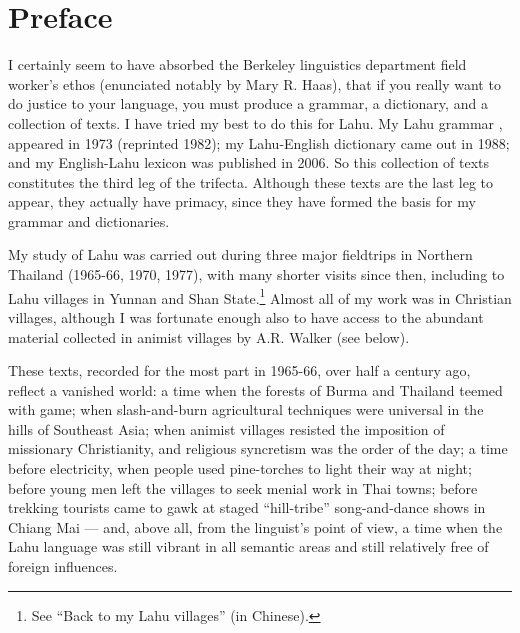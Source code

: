 \vspace{0.25em}

\renewcommand{\thefootnote}{\arabic{footnote}}
\setcounter{footnote}{0}


\chapter*{Preface}
I certainly seem to have absorbed the Berkeley linguistics department
field worker's ethos (enunciated notably by Mary R. Haas), that if you
really want to do justice to your language, you must produce a grammar,
a dictionary, and a collection of texts. I have tried my best to do this
for Lahu. My Lahu grammar \citep[abbreviated ``GL'']{matisoff1973grammar}, appeared in 1973 (reprinted 1982); my
Lahu-English dictionary \citep[abbreviated ``DL'']{88} came out in 1988; and my English-Lahu
lexicon \citep[abbreviated ``ELL'']{matisoff2006english} was published in 2006. So this collection of texts
constitutes the third leg of the trifecta. Although these texts are the
last leg to appear, they actually have primacy, since they have formed
the basis for my grammar and dictionaries.

My study of Lahu was carried out during three major fieldtrips in
Northern Thailand (1965-66, 1970, 1977), with many shorter visits since
then, including to Lahu villages in Yunnan and Shan State.\footnote{See
\citet{matisoff2008} ``Back to my Lahu villages'' (in Chinese).} Almost all of my
work was in Christian villages, although I was fortunate enough also to
have access to the abundant material collected in animist villages by
A.R. Walker (see below).

These texts, recorded for the most part in 1965-66, over half a century
ago, reflect a vanished world: a time when the forests of Burma and
Thailand teemed with game; when slash-and-burn agricultural techniques
were universal in the hills of Southeast Asia; when animist villages
resisted the imposition of missionary Christianity, and religious
syncretism was the order of the day; a time before electricity, when
people used pine-torches to light their way at night; before young men
left the villages to seek menial work in Thai towns; before trekking
tourists came to gawk at staged ``hill-tribe'' song-and-dance shows in
Chiang Mai --- and, above all, from the linguist's point of view, a
time when the Lahu language was still vibrant in all semantic areas and
still relatively free of foreign influences.

